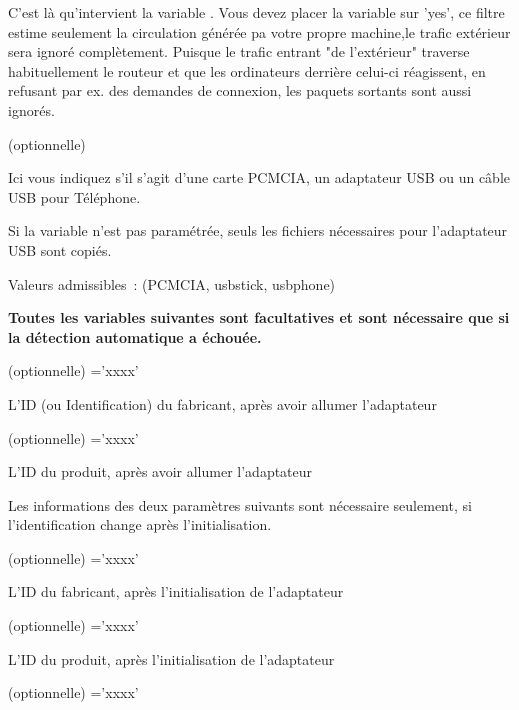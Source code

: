 \begin{description}
  C'est là qu'intervient la variable . Vous devez placer la
  variable sur 'yes', ce filtre estime seulement la circulation générée pa
  votre propre machine,le trafic extérieur sera ignoré complètement. Puisque le
  trafic entrant "de l'extérieur" traverse habituellement le routeur et que les
  ordinateurs derrière celui-ci réagissent, en refusant par ex. des demandes de
  connexion, les paquets sortants sont aussi ignorés.


  (optionnelle)

  Ici vous indiquez s'il s'agit d'une carte PCMCIA, un adaptateur USB ou un câble
  USB pour Téléphone.

  Si la variable n'est pas paramétrée, seuls les fichiers nécessaires pour
  l'adaptateur USB sont copiés.

  Valeurs admissibles~: (PCMCIA, usbstick, usbphone)

\textbf{Toutes les variables suivantes sont facultatives et sont nécessaire que si la
  détection automatique a échouée.}


  (optionnelle) ='xxxx'

  L'ID (ou Identification) du fabricant, après avoir allumer l'adaptateur

  (optionnelle) ='xxxx'

  L'ID du produit, après avoir allumer l'adaptateur

  Les informations des deux paramètres suivants sont nécessaire seulement, si
  l'identification change après l'initialisation.


  (optionnelle) ='xxxx'

  L'ID du fabricant, après l'initialisation de l'adaptateur


  (optionnelle) ='xxxx'

  L'ID du produit, après l'initialisation de l'adaptateur


  (optionnelle) ='xxxx'


\end{description}
